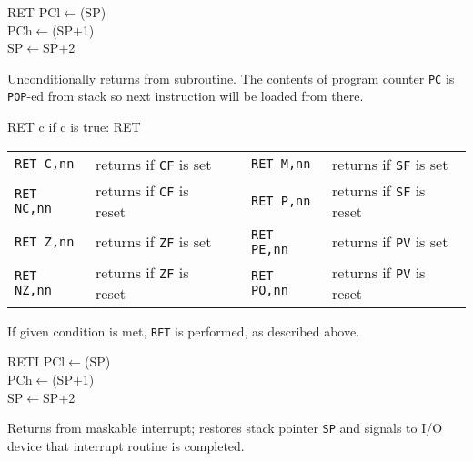 \documentclass[12pt,twoside,openright,a4paper]{book}
\begin{document}
\begin{basedescript}{
	\desclabelstyle{\multilinelabel}
	\desclabelwidth{3cm}}
	\pagebreak
	\begin{detailitem}{RET}
		{PCl$\leftarrow$(SP)\\
		PCh$\leftarrow$(SP+1)\\
		SP$\leftarrow$SP+2}

		Unconditionally returns from subroutine. The contents of program counter {\tt PC} is {\tt POP}-ed from stack so next instruction will be loaded from there.

		\DetailNoEffect
				
		\begin{DetailTiming}
		\end{DetailTiming}

	\end{detailitem}

	\begin{detailitem}{RET c}
		{if c is true: RET}

		\vspace{1ex} %
		\begin{tabular}{@{}llcll}
			{\tt RET C,nn} & returns if {\tt CF} is set & & 
				{\tt RET M,nn} & returns if {\tt SF} is set\\
			{\tt RET NC,nn} & returns if {\tt CF} is reset & & 
				{\tt RET P,nn} & returns if {\tt SF} is reset\\
			{\tt RET Z,nn} & returns if {\tt ZF} is set & & 
				{\tt RET PE,nn} & returns if {\tt PV} is set\\
			{\tt RET NZ,nn} & returns if {\tt ZF} is reset & & 
				{\tt RET PO,nn} & returns if {\tt PV} is reset\\
		\end{tabular}

		If given condition is met, {\tt RET} is performed, as described above.

		\DetailNoEffect
						
		\begin{DetailTiming}
			\DetailTime{c false}{1}{5}
			\DetailTime{c true}{3}{11}
		\end{DetailTiming}

	\end{detailitem}

	\begin{detailitem}{RETI}
		{PCl$\leftarrow$(SP)\\
		PCh$\leftarrow$(SP+1)\\
		SP$\leftarrow$SP+2}

		Returns from maskable interrupt; restores stack pointer {\tt SP} and signals to I/O device that interrupt routine is completed.
		

\end{detailitem}
\end{basedescript}
\end{document}
